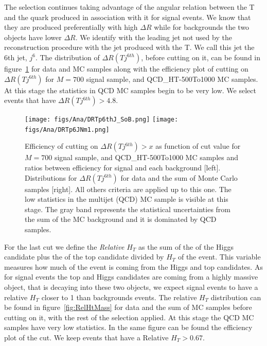 The selection continues taking advantage of the angular relation between the T and the quark produced in association with it for signal events. We know that they are produced preferentially with high $\Delta R$ while for backgrounds the two objects have lower $\Delta R$. We identify with the leading jet not used by the reconstruction procedure with the jet produced with the T. We call this jet the 6th jet, $j^{6}$. The distribution of $\Delta R (T j^{6th})$, before cutting on it, can be found in figure~\ref{fig:jet6} for data and MC samples along with the efficiency plot of cutting on $\Delta R (T j^{6th})$ for $M=700$ \GeVcc signal sample, \ttbar and QCD\_HT-500To1000 MC samples. At this stage the statistics in QCD MC samples begin to be very low. We select events that have $\Delta R (T j^{6th})>4.8$. 

\begin{figure}[!Hhtbp]
  \begin{center}
    \texttt{[image: figs/Ana/DRTp6thJ\_SoB.png]}
    \texttt{[image: figs/Ana/DRTp6JNm1.png]}
    \caption{Efficiency of cutting on $\Delta R (T j^{6th})>x$ as function of cut value for $M=700$ \GeVcc signal sample, \ttbar and QCD\_HT-500To1000 MC samples and ratios between efficiency for signal and each background [left]. Distributions for $\Delta R (T j^{6th})$  for data and the sum of Monte Carlo samples [right]. All others criteria are applied up to this one. The low statistics in the multijet (QCD) MC sample is visible at this stage. The gray band represents the statistical uncertainties from the sum of the MC background and it is dominated by QCD samples.}
    \label{fig:jet6}
  \end{center}
\end{figure}

For the last cut we define the \textit{Relative} $H_{T}$ as the sum of the \pt of the Higgs candidate plus the \pt of the top candidate divided by $H_{T}$ of the event. This variable measures how much \pt of the event is coming from the Higgs and top candidates. As for signal events the top and Higgs candidates are coming from a highly massive object, that is decaying into these two objects, we expect signal events to have a relative $H_{T}$ closer to 1 than backgrounds events. The relative $H_{T}$ distribution can be found in figure~\ref{fig:RelHtMass} for data and the sum of MC samples before cutting on it, with the rest of the selection applied. At this stage the QCD MC samples have very low statistics. In the same figure can be found the efficiency plot of the cut. We keep events that have a Relative $H_{T}>0.67$. 

